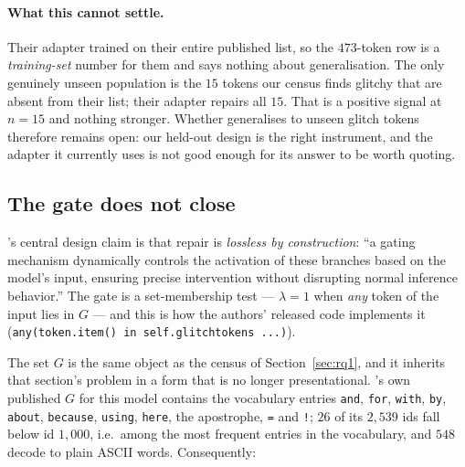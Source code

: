 \paragraph{What this cannot settle.} Their adapter trained on their entire
published list, so the $473$-token row is a \emph{training-set} number for them
and says nothing about generalisation. The only genuinely unseen population is
the $15$ tokens our census finds glitchy that are absent from their list; their
adapter repairs all $15$. That is a positive signal at $n = 15$ and nothing
stronger. Whether \gc{} generalises to unseen glitch tokens therefore remains
open: our held-out design is the right instrument, and the adapter it currently
uses is not good enough for its answer to be worth quoting.

\subsection{The gate does not close}
\label{sec:gate}

\gc{}'s central design claim is that repair is \emph{lossless by construction}:
``a gating mechanism dynamically controls the activation of these branches based
on the model's input, ensuring precise intervention without disrupting normal
inference behavior.'' The gate is a set-membership test --- $\lambda = 1$ when
\emph{any} token of the input lies in $G$ --- and this is how the authors'
released code implements it
(\texttt{any(token.item() in self.glitchtokens ...)}).

The set $G$ is the same object as the census of Section~\ref{sec:rq1}, and it
inherits that section's problem in a form that is no longer presentational.
\gc{}'s own published $G$ for this model contains the vocabulary entries
\texttt{and}, \texttt{for}, \texttt{with}, \texttt{by}, \texttt{about},
\texttt{because}, \texttt{using}, \texttt{here}, the apostrophe, \texttt{=} and
\texttt{!}; $26$ of its $2{,}539$ ids fall below id $1{,}000$, i.e.\ among the
most frequent entries in the vocabulary, and $548$ decode to plain ASCII words.
Consequently:


